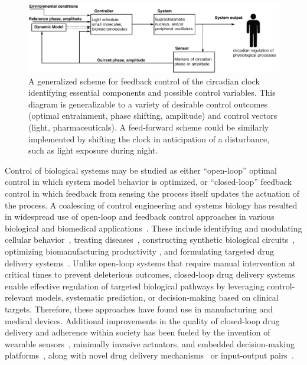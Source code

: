 \begin{figure}[p]
    \begin{center}
        \includegraphics[width=180mm]{chap1/figures/figure_4_simple_control_scheme.pdf}
    \end{center}
    \caption{A generalized scheme for feedback control of the circadian clock identifying essential components and possible control variables. This diagram is generalizable to a variety of desirable control outcomes (optimal entrainment, phase shifting, amplitude) and control vectors (light, pharmaceuticals). A feed-forward scheme could be similarly implemented by shifting the clock in anticipation of a disturbance, such as light exposure during night.    \label{fig:control}}
\end{figure}

    Control of biological systems may be studied as either ``open-loop'' optimal control in which system model behavior is optimized, or ``closed-loop'' feedback control in which feedback from sensing the process itself updates the actuation of the process.
A coalescing of control engineering and systems biology has resulted in widespread use of open-loop and feedback control approaches in various biological and biomedical applications~\cite{Lauffenburger2000, Bailey2005}.
These include identifying and modulating cellular behavior~\cite{Julius2008, Perley2014, Yan2017}, treating diseases~\cite{ElSamad2005, Gondhalekar2016}, constructing synthetic biological circuits~\cite{Chen2013, DelVecchio2017}, optimizing biomanufacturing productivity \cite{Craven2014, Giordano2016}, and formulating targeted drug delivery systems~\cite{Haddad2003, Luni2011, Yu2017, Jin2017}.
Unlike open-loop systems that require manual intervention at critical times to prevent deleterious outcomes, closed-loop drug delivery systems enable effective regulation of targeted biological pathways by leveraging control-relevant models, systematic prediction, or decision-making based on clinical targets.
Therefore, these approaches have found use in manufacturing and medical devices.
Additional improvements in the quality of closed-loop drug delivery and adherence within society has been fueled by the invention of wearable sensors~\cite{Amendola2014}, minimally invasive actuators, and embedded decision-making platforms~\cite{Zavitsanou2016}, along with novel drug delivery mechanisms~\cite{Qiu2017} or input-output pairs~\cite{Bakh2017}.

